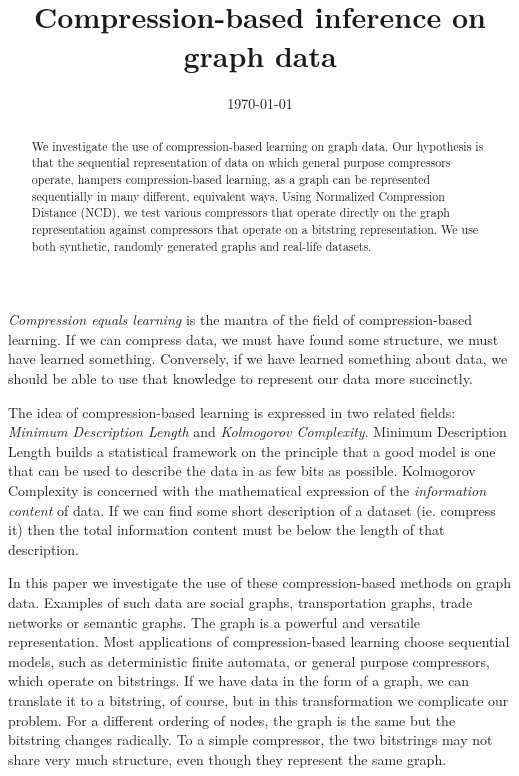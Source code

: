 \documentclass[10pt,a4paper,oneside]{article}
\title{Compression-based inference on graph data}
\date{\today}
\begin{document}
\maketitle

\begin{abstract}
We investigate the use of compression-based learning on graph data. Our hypothesis is that the sequential representation of data on which general purpose compressors operate, hampers compression-based learning, as a graph can be represented sequentially in many different, equivalent ways. Using Normalized Compression Distance (NCD), we test various compressors that operate directly on the graph representation against compressors that operate on a bitstring representation. We use both synthetic, randomly generated graphs and real-life datasets. 
\end{abstract}

\emph{Compression equals learning} is the mantra of the field of compression-based learning. If we can compress data, we must have found some structure, we must have learned something. Conversely, if we have learned something about data, we should be able to use that knowledge to represent our data more succinctly.

The idea of compression-based learning is expressed in two related fields: \emph{Minimum Description Length} and \emph{Kolmogorov Complexity}. Minimum Description Length \cite{grunwald2007minimum} builds a statistical framework on the principle that a good model is one that can be used to describe the data in as few bits as possible. Kolmogorov Complexity \cite{li1997introduction} is concerned with the mathematical expression of the \emph{information content} of  data. If we can find some short description of a dataset (ie. compress it) then the total information content must be below the length of that description.

In this paper we investigate the use of these compression-based methods on graph data. Examples of such data are social graphs, transportation graphs, trade networks or semantic graphs. The graph is a powerful and versatile representation. Most applications of compression-based learning choose sequential models, such as deterministic finite automata, or general purpose compressors, which operate on bitstrings. If we have data in the form of a graph, we can translate it to a bitstring, of course, but in this transformation we complicate our problem. For a different ordering of nodes, the graph is the same but the bitstring changes radically. To a simple compressor, the two bitstrings may not share very much structure, even though they represent the same graph.
\end{document}
